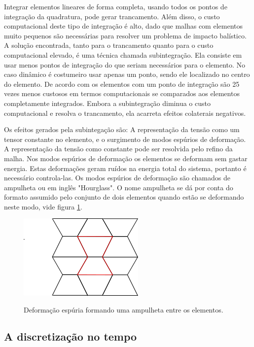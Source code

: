 Integrar elementos lineares de forma completa, usando todos os pontos de integração da quadratura, pode gerar trancamento. Além disso, o custo computacional deste tipo de integração é alto, dado que malhas com elementos muito pequenos são necessárias para resolver um problema de impacto balístico. A solução encontrada, tanto para o trancamento quanto para o custo computacional elevado, é uma técnica chamada subintegração. Ela consiste em usar menos pontos de integração do que seriam necessários para o elemento. No caso dinâmico é costumeiro usar apenas um ponto, sendo ele localizado no centro do elemento. De acordo com \cite{theorymanls} os elementos com um ponto de integração são 25 vezes menos custosos em termos computacionais se comparados aos elementos completamente integrados. Embora a subintegração diminua o custo computacional e resolva o trancamento, ela acarreta efeitos colaterais negativos. \par

Os efeitos gerados pela subintegação são: A representação da tensão como um tensor constante no elemento, e o surgimento de modos espúrios de deformação. A representação da tensão como constante pode ser resolvida pelo refino da malha. Nos modos espúrios de deformação os elementos se deformam sem gastar energia. Estas deformações geram ruídos na energia total do sistema, portanto é necessário controla-las. Os modos espúrios de deformação são chamados de ampulheta ou em inglês "Hourglass". O nome ampulheta se dá por conta do formato assumido pelo conjunto de dois elementos quando estão se deformando neste modo, vide figura \ref{fig:hourglass}. 

\begin{figure}
    \centering
    \caption{Deformação espúria formando uma ampulheta entre os elementos.}
    \includegraphics[width=0.5\linewidth]{images/hourglass.png}
    \label{fig:hourglass}
\end{figure}

\subsection{A discretização no tempo}

